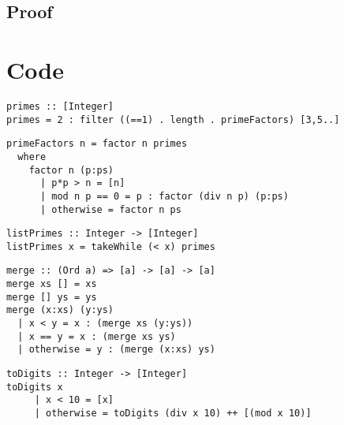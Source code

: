 \documentclass[a4paper,11pt]{article}
\begin{document}
\subsection{Proof}

\section{Code}

\begin{lstlisting}
primes :: [Integer]
primes = 2 : filter ((==1) . length . primeFactors) [3,5..]
\end{lstlisting}

\begin{lstlisting}
primeFactors n = factor n primes
  where
    factor n (p:ps) 
      | p*p > n = [n]
      | mod n p == 0 = p : factor (div n p) (p:ps)
      | otherwise = factor n ps
\end{lstlisting}

\begin{lstlisting}
listPrimes :: Integer -> [Integer]
listPrimes x = takeWhile (< x) primes
\end{lstlisting}
\begin{lstlisting}
merge :: (Ord a) => [a] -> [a] -> [a]
merge xs [] = xs
merge [] ys = ys
merge (x:xs) (y:ys)
  | x < y = x : (merge xs (y:ys))
  | x == y = x : (merge xs ys)
  | otherwise = y : (merge (x:xs) ys)
\end{lstlisting}
\begin{lstlisting}
toDigits :: Integer -> [Integer]
toDigits x
	 | x < 10 = [x]
	 | otherwise = toDigits (div x 10) ++ [(mod x 10)]
\end{lstlisting}
\end{document}
